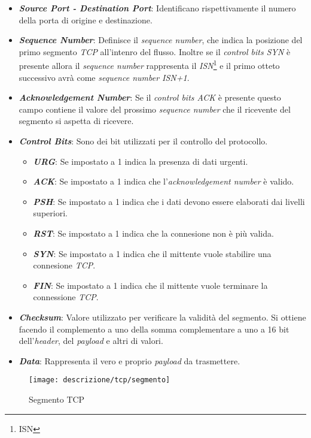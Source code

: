 \begin{itemize}
\item \textit{\textbf{Source Port - Destination Port}}: Identificano rispettivamente il numero della porta di origine e destinazione.
\item \textit{\textbf{Sequence Number}}: Definisce il \emph{sequence number}, che indica la posizione del primo segmento \emph{TCP} all'intenro del flusso. Inoltre se il \emph{control bits SYN} è presente allora il \emph{sequence number} rappresenta il \emph{ISN}\footnote{\gls{ISN}} e il primo otteto successivo avrà come \emph{sequence number ISN+1}.
\item \textit{\textbf{Acknowledgement Number}}: Se il \emph{control bits ACK} è presente questo campo contiene il valore del prossimo \emph{sequence number} che il ricevente del segmento si aspetta di ricevere.
\item \textit{\textbf{Control Bits}}: Sono dei bit utilizzati per il controllo del protocollo. 
\begin{itemize}
    \item \textit{\textbf{URG}}: Se impostato a 1 indica la presenza di dati urgenti.
    \item \textit{\textbf{ACK}}: Se impostato a 1 indica che l'\emph{acknowledgement number} è valido.
    \item \textit{\textbf{PSH}}: Se impostato a 1 indica che i dati devono essere elaborati dai livelli superiori.
    \item \textit{\textbf{RST}}: Se impostato a 1 indica che la connesione non è più valida.
    \item \textit{\textbf{SYN}}: Se impostato a 1 indica che il mittente vuole stabilire una connesione \emph{TCP}.
    \item \textit{\textbf{FIN}}: Se impostato a 1 indica che il mittente vuole terminare la connessione \emph{TCP}.
\end{itemize}
\item \textit{\textbf{Checksum}}: Valore utilizzato per verificare la validità del segmento. Si ottiene facendo il complemento a uno della somma complementare a uno a 16 bit dell'\emph{header}, del \emph{payload} e altri di valori.
\item \textit{\textbf{Data}}: Rappresenta il vero e proprio \emph{payload} da trasmettere.
\end{itemize}

\begin{figure}[!h]
\centering
\texttt{[image: descrizione/tcp/segmento]}
\caption{Segmento TCP}
\label{fig}
\end{figure}


